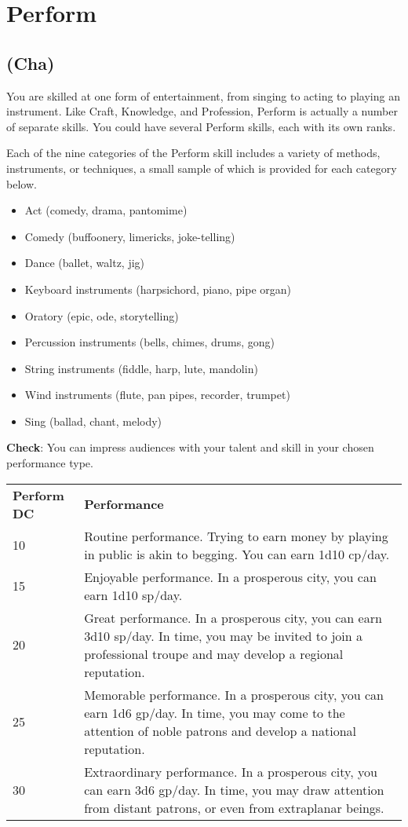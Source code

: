 \section{Perform}

\label{f0}
\subsection{(Cha)}

				
You are skilled at one form of entertainment, from singing to acting to playing an instrument. Like Craft, Knowledge, and Profession, Perform is actually a number of separate skills. You could have several Perform skills, each with its own ranks.
				
Each of the nine categories of the Perform skill includes a variety of methods, instruments, or techniques, a small sample of which is provided for each category below.
				\begin{itemize}\item  Act (comedy, drama, pantomime)
				\item  Comedy (buffoonery, limericks, joke-telling)
				\item  Dance (ballet, waltz, jig)
				\item  Keyboard instruments (harpsichord, piano, pipe organ)
				\item  Oratory (epic, ode, storytelling)
				\item  Percussion instruments (bells, chimes, drums, gong)
				\item  String instruments (fiddle, harp, lute, mandolin)
				\item  Wind instruments (flute, pan pipes, recorder, trumpet)
				\item  Sing (ballad, chant, melody)
\end{itemize}
				
\textbf{Check}: You can impress audiences with your talent and skill in your chosen performance type.

\begin{table}
\sffamily
 \begin{tabularx}{\linewidth}{lX}
  \textbf{Perform DC} & \textbf{Performance}\\
  10 & Routine performance. Trying to earn money by playing in public is akin to begging. You can earn 1d10 cp/day.\\
15 & Enjoyable performance. In a prosperous city, you can earn 1d10 sp/day.\\
20 & Great performance. In a prosperous city, you can earn 3d10 sp/day. In time, you may be invited to join a professional troupe and may develop a regional reputation.\\
25 & Memorable performance. In a prosperous city, you can earn 1d6 gp/day. In time, you may come to the attention of noble patrons and develop a national reputation.\\
30 & Extraordinary performance. In a prosperous city, you can earn 3d6 gp/day. In time, you may draw attention from distant patrons, or even from extraplanar beings.\\		
 \end{tabularx}
\end{table}
	

